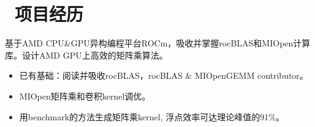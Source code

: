 \documentclass{resume}
\begin{document}

\section{\faUsers\ 项目经历}
\begin{onehalfspacing}
    基于AMD CPU\&GPU异构编程平台ROCm，吸收并掌握rocBLAS和MIOpen计算库。设计AMD GPU上高效的矩阵乘算法。
\begin{itemize}
    \item 已有基础：阅读并吸收rocBLAS，rocBLAS \& MIOpenGEMM contributor。
  \item MIOpen矩阵乘和卷积kernel调优。
  \item 用benchmark的方法生成矩阵乘kernel, 浮点效率可达理论峰值的91\%。
\end{itemize}
\end{onehalfspacing}
\end{document}
